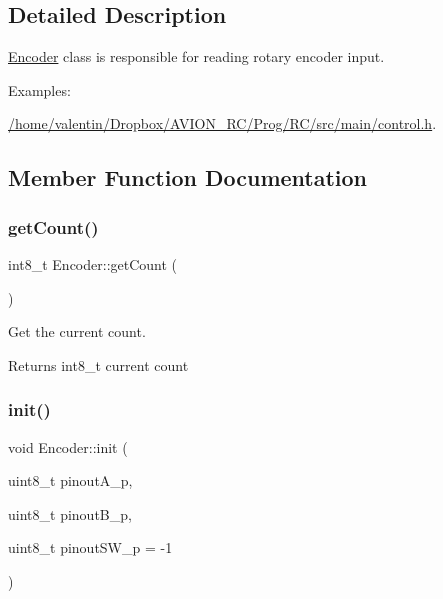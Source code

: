 \subsection{Detailed Description}
\hyperlink{class_encoder}{Encoder} class is responsible for reading rotary encoder input. \begin{Desc}
\item[Examples\+: ]\par
\hyperlink{_2home_2valentin_2_dropbox_2_a_v_i_o_n__r_c_2_prog_2_r_c_2src_2main_2control_8h-example}{/home/valentin/\+Dropbox/\+A\+V\+I\+O\+N\+\_\+\+R\+C/\+Prog/\+R\+C/src/main/control.\+h}.\end{Desc}


\subsection{Member Function Documentation}
\mbox{\label{class_encoder_a5e3fddf160e67d970c9c2cd57be5709a}} 
\subsubsection{\texorpdfstring{get\+Count()}{getCount()}}
{\footnotesize\ttfamily int8\+\_\+t Encoder\+::get\+Count (\begin{DoxyParamCaption}{ }\end{DoxyParamCaption})}



Get the current count. 

\begin{DoxyReturn}{Returns}
int8\+\_\+t current count 
\end{DoxyReturn}
\mbox{\label{class_encoder_a430e95a76f5b958b5350992c065d0b29}} 
\subsubsection{\texorpdfstring{init()}{init()}}
{\footnotesize\ttfamily void Encoder\+::init (\begin{DoxyParamCaption}\item[{uint8\+\_\+t}]{pinout\+A\+\_\+p,  }\item[{uint8\+\_\+t}]{pinout\+B\+\_\+p,  }\item[{uint8\+\_\+t}]{pinout\+S\+W\+\_\+p = {\ttfamily -\/1} }\end{DoxyParamCaption})}



